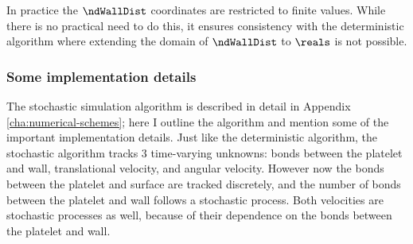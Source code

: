 In practice the $\ndWallDist$ coordinates are restricted to finite
values. While there is no practical need to do this, it ensures
consistency with the deterministic algorithm where extending the
domain of $\ndWallDist$ to $\reals$ is not possible.

\subsubsection{Some implementation details}
\label{sec:some-impl-deta}

The stochastic simulation algorithm is described in detail in Appendix
\ref{cha:numerical-schemes}; here I outline the algorithm and mention
some of the important implementation details. Just like the
deterministic algorithm, the stochastic algorithm tracks 3
time-varying unknowns: bonds between the platelet and wall,
translational velocity, and angular velocity. However now the bonds
between the platelet and surface are tracked discretely, and the
number of bonds between the platelet and wall follows a stochastic
process. Both velocities are stochastic processes as well, because of
their dependence on the bonds between the platelet and wall.

